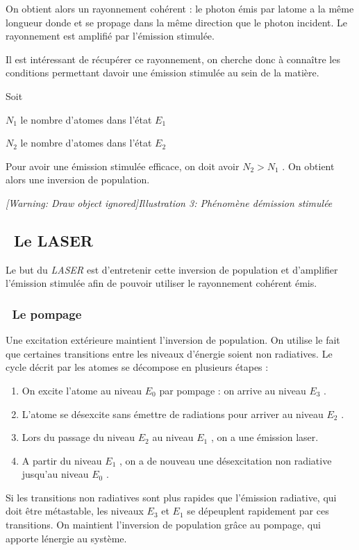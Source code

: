 \documentclass[12pt,twoside]{article}
\newcommand\liststyleLiv{%
\renewcommand\theenumi{\arabic{enumi}}
\renewcommand\theenumii{\arabic{enumii}}
\renewcommand\theenumiii{\arabic{enumiii}}
\renewcommand\theenumiv{\arabic{enumiv}}
\renewcommand\labelenumi{\theenumi.}
\renewcommand\labelenumii{\theenumii.}
\renewcommand\labelenumiii{\theenumiii.}
\renewcommand\labelenumiv{\theenumiv.}
}
\begin{document}
On obtient alors un rayonnement coh\'erent : le photon \'emis par
l{\textquotesingle}atome a la m\^eme longueur d{\textquotesingle}onde
et se propage dans la m\^eme direction que le photon incident. Le
rayonnement est amplifi\'e par l'\'emission stimul\'ee.

Il est int\'eressant de r\'ecup\'erer ce rayonnement, on cherche donc
\`a conna\^itre les conditions permettant d{\textquotesingle}avoir une
\'emission stimul\'ee au sein de la mati\`ere.

Soit

 $N_{1}$ le nombre d'atomes dans l'\'etat $E_{1}$ 

 $N_{2}$ le nombre d'atomes dans l'\'etat $E_{2}$ 

Pour avoir une \'emission stimul\'ee efficace, on doit avoir
$N_{2}>N_{1}$ . On obtient alors une inversion de population.

{\centering
\begin{minipage}{7.753cm}
{\itshape
[Warning: Draw object ignored]Illustration 3: Ph\'enom\`ene
d{\textquotesingle}\'emission stimul\'ee}
\end{minipage}
\par}

\subsection[\ Le LASER]{\bfseries \ Le LASER}
Le but du \textit{LASER} est d'entretenir cette inversion de population
et d'amplifier l'\'emission stimul\'ee afin de pouvoir utiliser le
rayonnement coh\'erent \'emis.

\subsubsection[\ Le pompage]{\ Le pompage}
Une excitation ext\'erieure maintient l'inversion de population. On
utilise le fait que certaines transitions entre les niveaux d'\'energie
soient non radiatives. Le cycle d\'ecrit par les atomes se d\'ecompose
en plusieurs \'etapes :

\liststyleLiv
\begin{enumerate}
\item On excite l'atome au niveau $E_{0}$ par pompage : on arrive au
niveau $E_{3}$ .
\item L'atome se d\'esexcite sans \'emettre de radiations pour arriver
au niveau $E_{2}$ . 
\item Lors du passage du niveau $E_{2}$ au niveau $E_{1}$ , on a une
\'emission laser.
\item A partir du niveau  $E_{1}$ , on a de nouveau une d\'esexcitation
non radiative jusqu'au niveau  $E_{0}$ .
\end{enumerate}
Si les transitions non radiatives sont plus rapides que l'\'emission
radiative, qui doit \^etre m\'etastable, les niveaux $E_{3}$ et $E_{1}$
se d\'epeuplent rapidement par ces transitions. On maintient
l'inversion de population gr\^ace au pompage, qui apporte
l{\textquotesingle}\'energie au syst\`eme.
\end{document}
